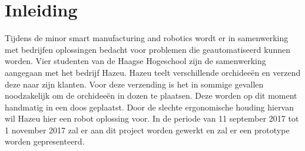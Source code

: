 
\section{Inleiding}

Tijdens de minor smart manufacturing and robotics wordt er in samenwerking met bedrijfen oplossingen bedacht voor problemen die geautomatiseerd kunnen worden. Vier studenten van de Haagse Hogeschool zijn de samenwerking aangegaan met het bedrijf Hazeu. Hazeu teelt verschillende orchideeën en verzend deze naar zijn klanten. Voor deze verzending is het in sommige gevallen noodzakelijk om de orchideeën in dozen te plaatsen. Deze worden op dit moment handmatig in een doos geplaatst. Door de slechte ergonomische houding hiervan wil Hazeu hier een robot oplossing voor. In de periode van 11 september 2017 tot 1 november 2017 zal er aan dit project worden gewerkt en zal er een prototype worden gepresenteerd.

\newpage
